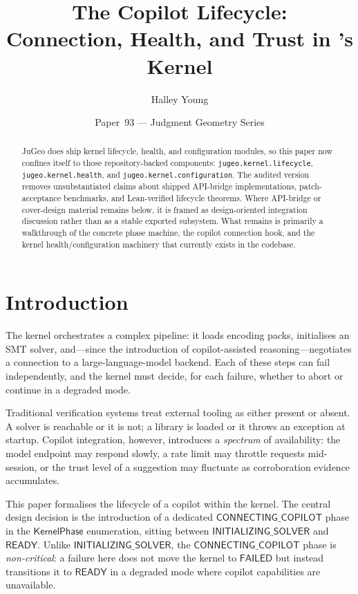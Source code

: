 \documentclass[11pt]{article}
\title{The Copilot Lifecycle:\\
  Connection, Health, and Trust in \JuGeo's Kernel}
\author{Halley Young}
\date{Paper~93 — Judgment Geometry Series}
\newcommand{\KP}{\mathsf{KernelPhase}}
\newcommand{\INITSOLVER}{\mathsf{INITIALIZING\_SOLVER}}
\newcommand{\CONNECTING}{\mathsf{CONNECTING\_COPILOT}}
\newcommand{\READY}{\mathsf{READY}}
\newcommand{\FAILED}{\mathsf{FAILED}}
\begin{document}
\maketitle

\begin{abstract}
JuGeo does ship kernel lifecycle, health, and configuration modules, so
this paper now confines itself to those repository-backed components:
\texttt{jugeo.kernel.lifecycle}, \texttt{jugeo.kernel.health}, and
\texttt{jugeo.kernel.configuration}.  The audited version removes
unsubstantiated claims about shipped API-bridge implementations,
patch-acceptance benchmarks, and Lean-verified lifecycle theorems.
Where API-bridge or cover-design material remains below, it is framed as
design-oriented integration discussion rather than as a stable exported
subsystem.  What remains is primarily a walkthrough of the concrete
phase machine, the copilot connection hook, and the kernel
health/configuration machinery that currently exists in the codebase.
\end{abstract}

\section{Introduction}\label{sec:intro}

The \JuGeo{} kernel orchestrates a complex pipeline: it loads
encoding packs, initialises an SMT solver, and—since the
introduction of copilot-assisted reasoning—negotiates a connection
to a large-language-model backend.  Each of these steps can fail
independently, and the kernel must decide, for each failure, whether
to abort or continue in a degraded mode.

Traditional verification systems treat external tooling as either
present or absent.  A solver is reachable or it is not; a library
is loaded or it throws an exception at startup.  Copilot
integration, however, introduces a \emph{spectrum} of availability:
the model endpoint may respond slowly, a rate limit may throttle
requests mid-session, or the trust level of a suggestion may
fluctuate as corroboration evidence accumulates.

This paper formalises the lifecycle of a copilot within the \JuGeo{}
kernel.  The central design decision is the introduction of a
dedicated $\CONNECTING$ phase in the $\KP$
enumeration, sitting between $\INITSOLVER$ and $\READY$.
Unlike $\INITSOLVER$, the $\CONNECTING$ phase is
\emph{non-critical}: a failure here does not move the kernel to
$\FAILED$ but instead transitions it to $\READY$ in a
degraded mode where copilot capabilities are unavailable.
\end{document}
